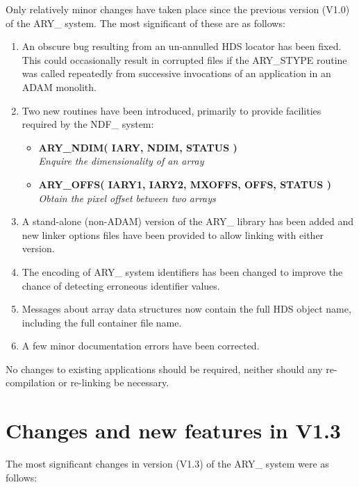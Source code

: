 \documentclass[twoside,11pt,nolof]{starlink}
\providecommand{\noteroutine}[2]{\textbf{#1}\hspace*{\fill}\nopagebreak \\
                             \hspace*{3em}\emph{#2}\hspace*{\fill}\par}
\begin{document}
Only relatively minor changes have taken place since the previous
version (V1.0) of the ARY\_ system.  The most significant of these are
as follows:

\begin{enumerate}

\item An obscure bug resulting from an un-annulled HDS locator has been
fixed.  This could occasionally result in corrupted files if the
ARY\_STYPE routine was called repeatedly from successive invocations of
an application in an ADAM monolith.

\item Two new routines have been introduced, primarily to provide facilities
required by the NDF\_ system:

\begin{itemize}

\item \noteroutine{ARY\_NDIM( IARY, NDIM, STATUS )}
                  {Enquire the dimensionality of an array}

\item \noteroutine{ARY\_OFFS( IARY1, IARY2, MXOFFS, OFFS, STATUS )}
                  {Obtain the pixel offset between two arrays}

\end{itemize}

\item A stand-alone (non-ADAM) version of the ARY\_ library has been
added and new linker options files have been provided to allow linking
with either version.

\item The encoding of ARY\_ system identifiers has been changed to
improve the chance of detecting erroneous identifier values.

\item Messages about array data structures now contain the full HDS object
name, including the full container file name.

\item A few minor documentation errors have been corrected.

\end{enumerate}

No changes to existing applications should be required, neither should any
re-compilation or re-linking be necessary.

\section{%
Changes and new features in V1.3}
\label{changes_and_new_features_in_v13}
The most significant changes in version (V1.3) of the ARY\_ system were
as follows:
\end{document}
